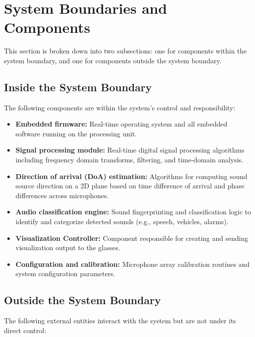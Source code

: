 \documentclass{article}
\begin{document}
\section{System Boundaries and Components}

This section is broken down into two subsections: one for components within the
system boundary, and one for components outside the system boundary.

\subsection{Inside the System Boundary}

The following components are within the system's control and responsibility:

\begin{itemize}
\item \textbf{Embedded firmware:} Real-time operating system and all embedded
software running on the processing unit.

\item \textbf{Signal processing module:} Real-time digital signal processing
algorithms including frequency domain transforms, filtering, and time-domain
analysis.

\item \textbf{Direction of arrival (DoA) estimation:} Algorithms for computing
sound source direction on a 2D plane based on time difference of arrival and
phase differences across microphones.

\item \textbf{Audio classification engine:} Sound fingerprinting and
classification logic to identify and categorize detected sounds (e.g., speech,
vehicles, alarms).

\item \textbf{Visualization Controller:} \label{comp:viz_controller} Component
responsible for creating and sending visualization output to the glasses.

\item \textbf{Configuration and calibration:} Microphone array calibration
routines and system configuration parameters.
\end{itemize}

\subsection{Outside the System Boundary}

The following external entities interact with the system but are not under its
direct control:
\end{document}
